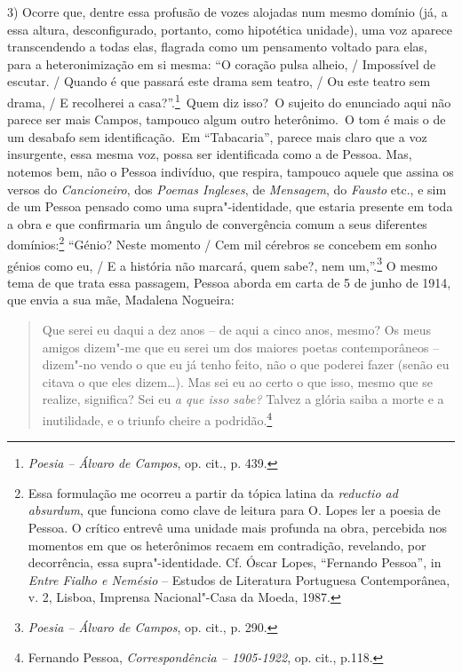 3) Ocorre que, dentre essa profusão de vozes alojadas num mesmo domínio
(já, a essa altura, desconfigurado, portanto, como hipotética unidade),
uma voz aparece transcendendo a todas elas, flagrada como um pensamento
voltado para elas, para a heteronimização em si mesma: ``O coração pulsa
alheio, / Impossível de escutar. / Quando é que passará este drama sem
teatro, / Ou este teatro sem drama, / E recolherei a casa?''.\footnote{\emph{Poesia
  -- Álvaro de Campos}, op. cit., p. 439.}~Quem diz isso?~O sujeito do
enunciado aqui não parece ser mais Campos, tampouco algum outro
heterônimo.~O tom é mais o de um desabafo sem identificação.~Em
``Tabacaria'', parece mais claro que a voz insurgente, essa mesma voz,
possa ser identificada como a de Pessoa. Mas, notemos bem, não o Pessoa
indivíduo, que respira, tampouco aquele que assina os versos do
\emph{Cancioneiro}, dos \emph{Poemas Ingleses}, de \emph{Mensagem}, do
\emph{Fausto} etc., e sim de um Pessoa pensado como uma
supra"-identidade, que estaria presente em toda a obra e que confirmaria
um ângulo de convergência comum a seus diferentes domínios:\footnote{Essa
  formulação me ocorreu a partir da tópica latina da \emph{reductio ad
  absurdum}, que funciona como clave de leitura para O. Lopes ler a
  poesia de Pessoa. O crítico entrevê uma unidade mais profunda na obra,
  percebida nos momentos em que os heterônimos recaem em contradição,
  revelando, por decorrência, essa supra"-identidade. Cf. Óscar Lopes,
  ``Fernando Pessoa'', in \emph{Entre Fialho e Nemésio} -- Estudos de
  Literatura Portuguesa Contemporânea, v. 2, Lisboa, Imprensa
  Nacional"-Casa da Moeda, 1987.} ``Génio? Neste momento / Cem mil
cérebros se concebem em sonho génios como eu, / E a história não
marcará, quem sabe?, nem um,''.\footnote{\emph{Poesia -- Álvaro de
  Campos}, op. cit., p. 290.} O mesmo tema de que trata essa passagem,
Pessoa aborda em carta de 5 de junho de 1914, que envia a sua mãe,
Madalena Nogueira:

\begin{quote}
Que serei eu daqui a dez anos -- de aqui a cinco anos, mesmo? Os meus
amigos dizem"-me que eu serei um dos maiores poetas contemporâneos --
dizem"-no vendo o que eu já tenho feito, não o que poderei fazer (senão
eu citava o que eles dizem\ldots{}). Mas sei eu ao certo o que isso, mesmo
que se realize, significa? Sei eu \emph{a que isso sabe?} Talvez a
glória saiba a morte e a inutilidade, e o triunfo cheire a
podridão.\footnote{Fernando Pessoa, \emph{Correspondência -- 1905-1922},
  op. cit., p.118.}
\end{quote}

